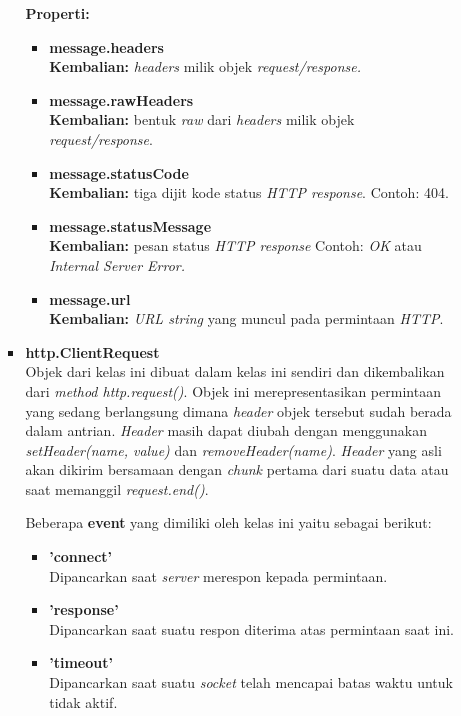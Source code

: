 \documentclass[a4paper,twoside]{article}
\begin{document}
\begin{enumerate}
\begin{enumerate}
\begin{itemize}
				\textbf{Properti:}
				\begin{itemize}
					\item \textbf{message.headers} \\ \textbf{Kembalian:} \textit{headers} milik objek \textit{request/response.}
					\item \textbf{message.rawHeaders} \\ \textbf{Kembalian:} bentuk \textit{raw} dari \textit{headers} milik objek \textit{request/response}.
					\item \textbf{message.statusCode} \\ \textbf{Kembalian:} tiga dijit kode status \textit{HTTP response}. Contoh: 404.
					\item \textbf{message.statusMessage} \\ \textbf{Kembalian:} pesan status \textit{HTTP response} Contoh: \textit{OK} atau \textit{Internal Server Error.}
					\item \textbf{message.url} \\ \textbf{Kembalian:} \textit{URL string} yang muncul pada permintaan \textit{HTTP}.
				\end{itemize}
				
				\item \textbf{http.ClientRequest} \\ 
				Objek dari kelas ini dibuat dalam kelas ini sendiri dan dikembalikan dari \textit{method http.request()}. Objek ini merepresentasikan permintaan yang sedang berlangsung dimana \textit{header} objek tersebut sudah berada dalam antrian. \textit{Header} masih dapat diubah dengan menggunakan \textit{setHeader(name, value)} dan \textit{removeHeader(name)}. \textit{Header} yang asli akan dikirim bersamaan dengan \textit{chunk} pertama dari suatu data atau saat memanggil \textit{request.end()}.
				
				Beberapa \textbf{event} yang dimiliki oleh kelas ini yaitu sebagai berikut:
				\begin{itemize}
					\item \textbf{'connect'} \\ Dipancarkan saat \textit{server} merespon kepada permintaan.
					\item \textbf{'response'} \\ Dipancarkan saat suatu respon diterima atas permintaan saat ini.
					\item \textbf{'timeout'} \\ Dipancarkan saat suatu \textit{socket} telah mencapai batas waktu untuk tidak aktif.
				\end{itemize}
				

\end{itemize}
\end{enumerate}
\end{enumerate}
\end{document}
